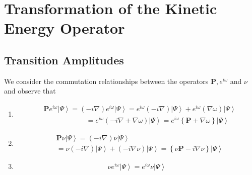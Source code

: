 \documentclass[aps,preprint]{revtex4}%
\begin{document}
\section{Transformation of the Kinetic Energy Operator\label{KinEnTrans}}

\subsection{Transition Amplitudes}

We consider the commutation relationships between the operators $\mathbf{P,}%
e^{i\omega}$ and $\nu$ and observe that

\begin{enumerate}
\item
\begin{align}
&  \mathbf{P}e^{i\omega}\left\vert \Psi\right\rangle =\left(  -i\nabla\right)
e^{i\omega}\left\vert \Psi\right\rangle =e^{i\omega}\left(  -i\nabla\right)
\left\vert \Psi\right\rangle +e^{i\omega}\left(  \nabla\omega\right)
\left\vert \Psi\right\rangle \nonumber\\
&  \qquad\qquad\qquad\left.  =\right.  e^{i\omega}\left(  -i\nabla
+\nabla\omega\right)  \left\vert \Psi\right\rangle =e^{i\omega}\left\{
\mathbf{P}+\nabla\omega\right\}  \left\vert \Psi\right\rangle
\end{align}


\item
\begin{align}
&  \mathbf{P}\nu\left\vert \Psi\right\rangle =\left(  -i\nabla\right)
\nu\left\vert \Psi\right\rangle \nonumber\\
&  =\nu\left(  -i\nabla\right)  \left\vert \Psi\right\rangle +\left(
-i\nabla\nu\right)  \left\vert \Psi\right\rangle =\left\{  \nu\mathbf{P}%
-i\nabla\nu\right\}  \left\vert \Psi\right\rangle
\end{align}


\item
\begin{equation}
\nu e^{i\omega}\left\vert \Psi\right\rangle =e^{i\omega}\nu\left\vert
\Psi\right\rangle
\end{equation}

\end{enumerate}
\end{document}
